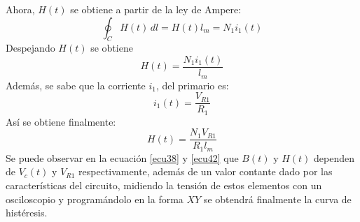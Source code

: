 \documentclass[twocolumn]{IEEEtran}
\begin{document}
\noindent
Ahora, $H(t)$ se obtiene a partir de la ley de Ampere:
\begin{equation}
\displaystyle\oint_{C} H(t)\, dl=H(t)l_m=N_1i_1(t)
\label{ecu39}
\end{equation}
\noindent
Despejando $H(t)$ se obtiene
\begin{equation}
H(t)=\frac{N_1i_1(t)}{l_m}
\label{ecu40}
\end{equation}
\noindent
Además, se sabe que la corriente  $i_1$, del primario es:
\begin{equation}
i_1(t)=\frac{V_{R1}}{R_1}
\label{ecu41}
\end{equation}
\noindent
Así se obtiene finalmente:
\begin{equation}
H(t)=\frac{N_1V_{R1}}{R_1l_m}
\label{ecu42}
\end{equation}
\noindent
Se puede observar en la ecuación \ref{ecu38} y  \ref{ecu42} que $B(t)$ y $H(t)$ dependen de $V_c(t)$ y $V_{R1}$ respectivamente, además de un valor contante dado por las características del circuito, midiendo la tensión de estos elementos con un osciloscopio y programándolo en la forma $XY$ se obtendrá finalmente la curva de histéresis.
\end{document}
